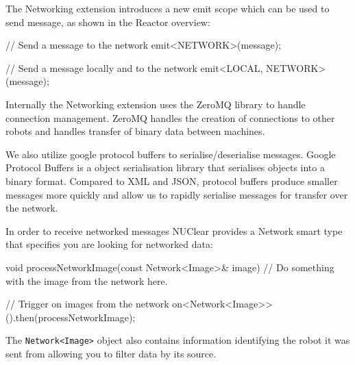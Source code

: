 \documentclass[english,12pt]{scrartcl}
\begin{document}
				The Networking extension introduces a new emit scope which can be used to send message, as shown in the Reactor overview:

				\begin{cppcode}
					// Send a message to the network
					emit<NETWORK>(message);

					// Send a message locally and to the network
					emit<LOCAL, NETWORK>(message);
				\end{cppcode}

				Internally the Networking extension uses the ZeroMQ library to handle connection management.
				ZeroMQ handles the creation of connections to other robots and handles transfer of binary data between machines.

				We also utilize google protocol buffers to serialise/deserialise messages.
				Google Protocol Buffers is a object serialisation library that serialises objects into a binary format.
				Compared to XML and JSON, protocol buffers produce smaller messages more quickly and allow us to rapidly serialise messages for transfer over the network.

				In order to receive networked messages NUClear provides a Network smart type that specifies you are looking for networked data:

				\begin{cppcode}
					void processNetworkImage(const Network<Image>& image) {
					    // Do something with the image from the network here.
					}

					// Trigger on images from the network
					on<Network<Image>>().then(processNetworkImage);
				\end{cppcode}

				The \texttt{Network<Image>} object also contains information identifying the robot it was sent from allowing you to filter data by its source.
\end{document}
